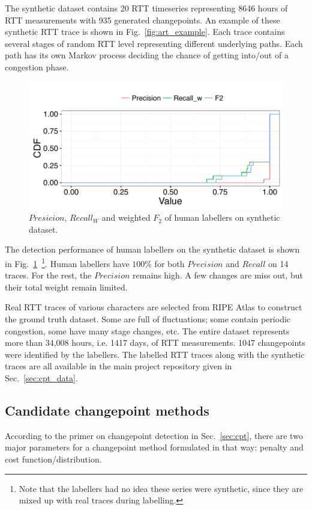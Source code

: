 The synthetic dataset contains 20 RTT timeseries %
representing 8646 hours of RTT measurements with 935 generated changepoints.
An example of these synthetic RTT trace is shown in Fig.~\ref{fig:art_example}.
Each trace contains several stages of random RTT level representing different underlying paths.
Each path has its own Markov process deciding the chance of getting into/out of a congestion phase. 

\begin{figure}[!htb]
\centering
\includegraphics[width=.72\textwidth]{gfx/chap4/antoine_eval.pdf}
\caption{$Presicion$, $Recall_W$ and weighted $F_2$ of human labellers on synthetic dataset.}
\label{fig:antoine_eval}
\end{figure}
The detection performance of human labellers on the synthetic dataset is shown in Fig.~\ref{fig:antoine_eval}~\footnote{Note that the labellers had no idea these series were synthetic, since they are mixed up with real traces during labelling.}. 
Human labellers have $100\%$ for both $Precision$ and $Recall$ on 14 traces.
For the rest, the $Precision$ remains high. A few changes are miss out, but their total weight remain limited.

Real RTT traces of various characters are selected from RIPE Atlas to construct the ground truth dataset. Some are full of fluctuations; some contain periodic congestion, some have many stage changes, etc.
The entire dataset represents more than 34,008 hours, i.e. 1417 days, of RTT measurements. 1047 changepoints were identified by the labellers.
The labelled RTT traces along with the synthetic traces are all available in the main project repository given in Sec.~\ref{sec:cpt_data}.

\subsection{Candidate changepoint methods}
\label{sec:method}
According to the primer on changepoint detection in Sec.~\ref{sec:cpt}, there are two major parameters for a changepoint method formulated in that way: penalty and cost function/distribution.

